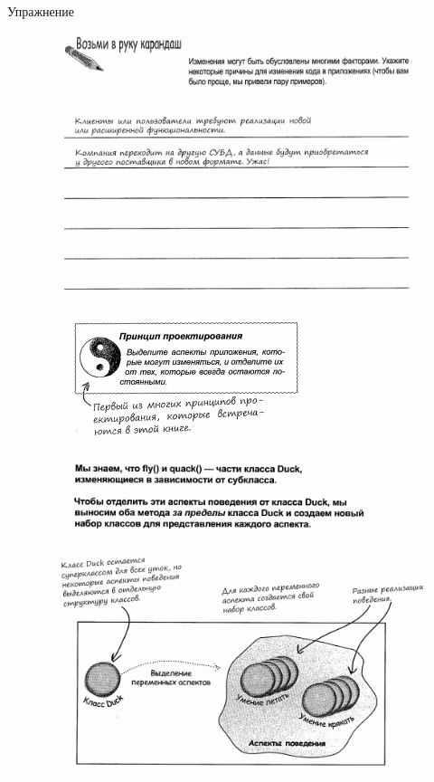 \documentclass{beamer}
\begin{document}
\begin{frame}{Упражнение}
\begin{figure}[h]
\centering
\includegraphics[scale=0.75]{images/lec09-pic08.png}
\label{pic-sort}
\end{figure}
\end{frame}

\begin{frame}
\begin{figure}[h]
\centering
\includegraphics[scale=1.5]{images/lec09-pic09.png}
\label{pic-sort}
\end{figure}
\end{frame}

\begin{frame}
\begin{figure}[h]
\centering
\includegraphics[scale=0.75]{images/lec09-pic10.png}
\label{pic-sort}
\end{figure}
\end{frame}
\end{document}
